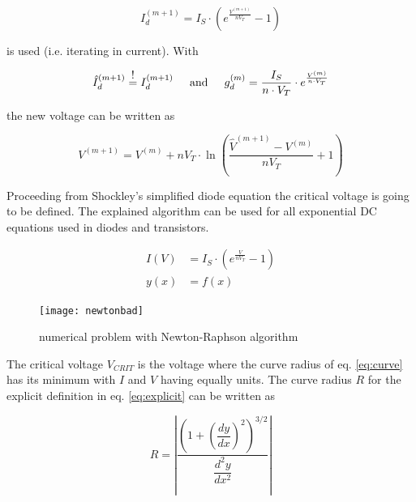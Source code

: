\begin{equation}
I_{d}^{(m+1)} = I_{S}\cdot \left(e^{\frac{V^{(m+1)}}{n V_{T}}} - 1\right)
\end{equation}

is used (i.e. iterating in current).  With

\begin{equation}
\hat{I}_{d}^{(m+1)} \; \shortstack{!\\=} \; I_{d}^{(m+1)}
\;\;\;\; \text{ and } \;\;\;\;
g_{d}^{(m)} = \dfrac{I_{S}}{n\cdot V_{T}}\cdot e^{\frac{V^{(m)}}{n\cdot V_{T}}}
\end{equation}

the new voltage can be written as

\begin{equation}
V^{(m+1)} = V^{(m)} + n V_{T}\cdot \ln{\left(\dfrac{\hat{V}^{(m+1)} - V^{(m)}}{n V_{T}} + 1\right)}
\end{equation}

Proceeding from Shockley's simplified diode equation the critical
voltage is going to be defined.  The explained algorithm can be used
for all exponential DC equations used in diodes and transistors.

\begin{align}
I\left(V\right) &= I_{S}\cdot \left(e^{\frac{V}{n V_{T}}} - 1\right)
\label{eq:curve}\\
y\left(x\right) &= f \left(x\right)
\label{eq:explicit}
\end{align}

\begin{figure}[ht]
\begin{center}
\texttt{[image: newtonbad]}
\end{center}
\caption{numerical problem with Newton-Raphson algorithm}
\label{fig:NewtonBad}
\end{figure}
\FloatBarrier

The critical voltage $V_{CRIT}$ is the voltage where the curve radius
of eq. \eqref{eq:curve} has its minimum with $I$ and $V$ having
equally units.  The curve radius $R$ for the explicit definition in
eq. \eqref{eq:explicit} can be written as

\begin{equation}
R = \left|\dfrac{\left(1+\left(\dfrac{dy}{dx}\right)^{2}\right)^{3/2}}{\dfrac{d^{2}y}{dx^{2}}}\right|
\label{eq:radius}
\end{equation}

